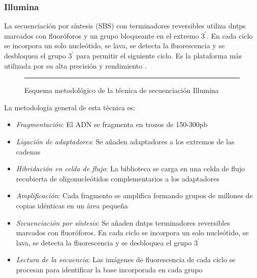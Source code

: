 \documentclass{AsignaturaResumen}
\begin{document}
\FloatBarrier
\subsubsection{Illumina}\label{sec:illumina}

La secuenciación por síntesis (SBS) con terminadores reversibles utiliza \acrshort{dntps} marcados con fluoróforos y un grupo bloqueante en el extremo $3^{\prime}$. En cada ciclo se incorpora un solo nucleótido, se lava, se detecta la fluorescencia y se desbloquea el grupo $3^{\prime}$ para permitir el siguiente ciclo. Es la plataforma más utilizada por su alta precisión y rendimiento \citep{erenDNASequencingMethods2022}.

\begin{figure}\centering
    \resizebox{\linewidth}{!}{}
    \rule{\linewidth}{0.5pt}
    \caption{Esquema metodológico de la técnica de secuenciación Illumina}
    \label{fig:esquema_secuenciacion_g2_illumina}
\end{figure}

La metodología general de esta técnica es:

\begin{itemize}
    \item \emph{Fragmentación}: El ADN se fragmenta en trozos de 150-300\acrshort{pb}
    \item \emph{Ligación de adaptadores}: Se añaden adaptadores a los extremos de las cadenas
    \item \emph{Hibridación en celda de flujo}: La biblioteca se carga en una celda de flujo recubierta de oligonucleótidos complementarios a los adaptadores
    \item \emph{Amplificación}: Cada fragmento se amplifica formando grupos de millones de copias idénticas en un área pequeña
    \item \emph{Secuenciación por síntesis}: Se añaden \acrshort{dntps} terminadores reversibles marcados con fluoróforos. En cada ciclo se incorpora un solo nucleótido, se lava, se detecta la fluorescencia y se desbloquea el grupo $3^{\prime}$
    \item \emph{Lectura de la secuencia}: Las imágenes de fluorescencia de cada ciclo se procesan para identificar la base incorporada en cada grupo
\end{itemize}

    
\end{document}
